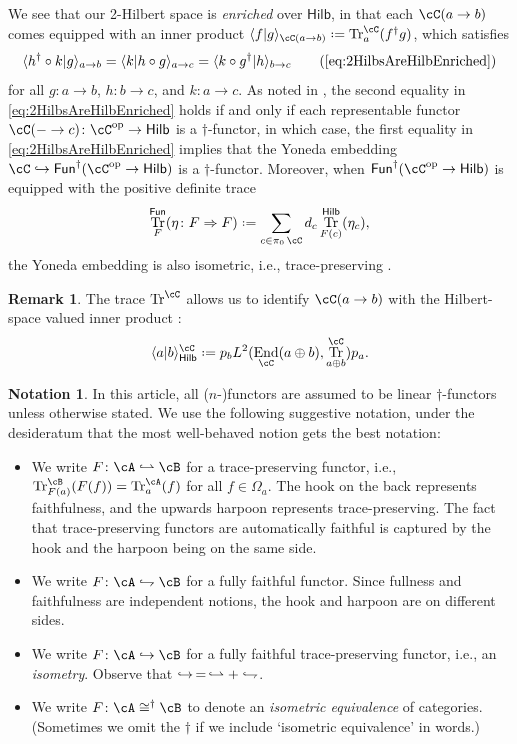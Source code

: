 \documentclass[12pt, reqno]{amsart}
\DeclareMathOperator{\End}{End}
\DeclareMathOperator{\Irr}{\pi_0}
\newcommand{\op}{\mathrm{op}}
\DeclareMathOperator{\Tr}{Tr}
\newcommand{\isometry}{\mathrel{\,\joinrel\lhook\joinrel\rightharpoonup}}
\newcommand{\fullyfaithful}{\mathrel{\,\joinrel\lhook\joinrel\rightharpoondown}}
\newcommand{\Fun}{\mathsf{Fun}}
\newcommand{\Hilb}{\mathsf{Hilb}}
\theoremstyle{plain}
\theoremstyle{definition}
\newtheorem{nota}[thm]{Notation}
\newtheorem{rem}[thm]{Remark}
\newcommand{\coloneq}{:=}
\def\coloneq{\mathrel{\vcenter{\baselineskip0.55ex\lineskiplimit0pt\hbox{\upshape.}\hbox{\upshape.}}}=}
\begin{document}
We see that our 2-Hilbert space is \emph{enriched} over $\Hilb$, in that each $\cC(a\to b)$ comes equipped with an inner product $\langle f|g\rangle_{\cC(a\to b)} \coloneq\Tr^\cC_a(f^\dag  g)$, which satisfies
\begin{equation}
\langle h^\dag \circ k | g \rangle_{a\to b}
=
\langle k | h \circ g \rangle_{a\to c}
=
\langle k\circ g^\dag | h  \rangle_{b\to c}
\tag{\ref{eq:2HilbsAreHilbEnriched}}
\end{equation}
for all 
$g\colon a\to b$, $h\colon b\to c$, and $k\colon  a\to c$.
As noted in \cite[Footnote~12]{MR4598730},
the second equality in \eqref{eq:2HilbsAreHilbEnriched} holds if and only if each representable functor $\cC(-\to c)\colon \cC^{\op}\to \Hilb$ is a $\dag$-functor, in which case, the first equality in \eqref{eq:2HilbsAreHilbEnriched} implies that the Yoneda embedding $\cC\hookrightarrow \Fun^\dag(\cC^{\mathrm{op}}\to \Hilb)$ is a $\dag$-functor.
Moreover, when $\Fun^\dag(\cC^{\op}\to \Hilb)$ is equipped with the positive definite trace
$$
\Tr^{\Fun}_F(\eta\colon F\Rightarrow F)
\coloneq
\sum_{c\in\Irr\cC} d_c \Tr^\Hilb_{F(c)}(\eta_{c}),
$$
the Yoneda embedding is also isometric, i.e., trace-preserving \cite[Rem.~2.16]{MR5078555}.

\begin{rem}
The trace $\Tr^\cC$ allows us to identify $\cC(a\to b)$ with the Hilbert-space valued inner product \cite{MR2325696,2411.01678}:
$$
\langle a|b\rangle^\cC_\Hilb \coloneq p_b L^2(\End_\cC(a\oplus b),\Tr^\cC_{a\oplus b}) p_a.
$$
\end{rem}

\begin{nota}
In this article, all ($n$-)functors are assumed to be linear $\dag$-functors unless otherwise stated.
We use the following suggestive notation, under the desideratum that the most well-behaved notion gets the best notation:
\begin{itemize}
\item 
We write $F\colon \cA\isometry \cB$ for a trace-preserving functor, i.e., $\Tr^\cB_{F(a)}(F(f))=\Tr^\cA_a(f)$ for all $f\in \Omega_a$.
The hook on the back represents faithfulness, and the upwards harpoon represents trace-preserving.
The fact that trace-preserving functors are automatically faithful is captured by the hook and the harpoon being on the same side.
\item 
We write $F\colon  \cA\fullyfaithful \cB$ for a fully faithful functor.
Since fullness and faithfulness are independent notions, the hook and harpoon are on different sides.
\item 
We write $F\colon \cA\hookrightarrow \cB$ for a fully faithful trace-preserving functor, i.e., an \emph{isometry}.
Observe that $\hookrightarrow \,=\, \isometry + \fullyfaithful$.
\item 
We write $F\colon \cA\cong^\dag \cB$ to denote an \emph{isometric equivalence} of categories.
(Sometimes we omit the $\dag$ if we include `isometric equivalence' in words.)
\end{itemize}
\end{nota}
\end{document}
